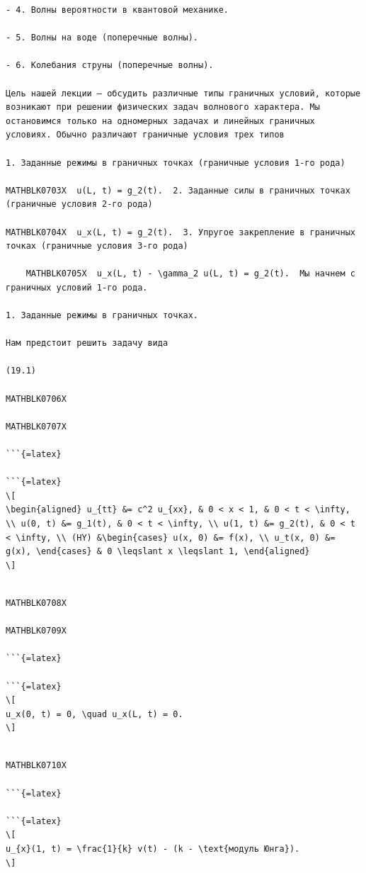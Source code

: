 \documentclass[
]{article}
\begin{document}
\begin{verbatim}
- 4. Волны вероятности в квантовой механике.

- 5. Волны на воде (поперечные волны).

- 6. Колебания струны (поперечные волны).

Цель нашей лекции — обсудить различные типы граничных условий, которые возникают при решении физических задач волнового характера. Мы остановимся только на одномерных задачах и линейных граничных условиях. Обычно различают граничные условия трех типов

1. Заданные режимы в граничных точках (граничные условия 1-го рода)

MATHBLK0703X  u(L, t) = g_2(t).  2. Заданные силы в граничных точках (граничные условия 2-го рода)

MATHBLK0704X  u_x(L, t) = g_2(t).  3. Упругое закрепление в граничных точках (граничные условия 3-го рода)

    MATHBLK0705X  u_x(L, t) - \gamma_2 u(L, t) = g_2(t).  Мы начнем с граничных условий 1-го рода.

1. Заданные режимы в граничных точках.

Нам предстоит решить задачу вида

(19.1)

MATHBLK0706X

MATHBLK0707X

```{=latex}

```{=latex}
\[
\begin{aligned} u_{tt} &= c^2 u_{xx}, & 0 < x < 1, & 0 < t < \infty, \\ u(0, t) &= g_1(t), & 0 < t < \infty, \\ u(1, t) &= g_2(t), & 0 < t < \infty, \\ (HY) &\begin{cases} u(x, 0) &= f(x), \\ u_t(x, 0) &= g(x), \end{cases} & 0 \leqslant x \leqslant 1, \end{aligned}
\]
\end{verbatim}

\begin{verbatim}

MATHBLK0708X

MATHBLK0709X

```{=latex}

```{=latex}
\[
u_x(0, t) = 0, \quad u_x(L, t) = 0.
\]
\end{verbatim}

\begin{verbatim}

MATHBLK0710X

```{=latex}

```{=latex}
\[
u_{x}(1, t) = \frac{1}{k} v(t) - (k - \text{модуль Юнга}).
\]
\end{verbatim}
\end{document}
